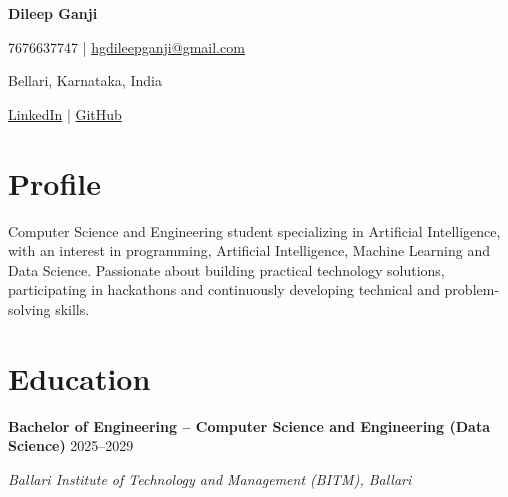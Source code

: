 \documentclass[11pt,a4paper]{article}
\begin{document}

\begin{center}

    {\Huge\bfseries Dileep Ganji}

    \vspace{6pt}

    7676637747
    \quad | \quad
    \href{mailto:hgdileepganji@gmail.com}
    {hgdileepganji@gmail.com}

    \vspace{3pt}

    Bellari, Karnataka, India

    \vspace{3pt}

    \href{https://www.linkedin.com/in/h-g-dileep-ganji-952a50396}
    {LinkedIn}
    \quad | \quad
    \href{https://github.com/hgdileepganji-art}
    {GitHub}

\end{center}

\vspace{5pt}


\section*{Profile}

Computer Science and Engineering student specializing in
Artificial Intelligence, with an interest in programming,
Artificial Intelligence, Machine Learning and Data Science.
Passionate about building practical technology solutions,
participating in hackathons and continuously developing
technical and problem-solving skills.


\section*{Education}

\textbf{
Bachelor of Engineering -- Computer Science and Engineering
(Data Science)
}
\hfill
2025--2029

\textit{
Ballari Institute of Technology and Management (BITM), Ballari
}
\end{document}
